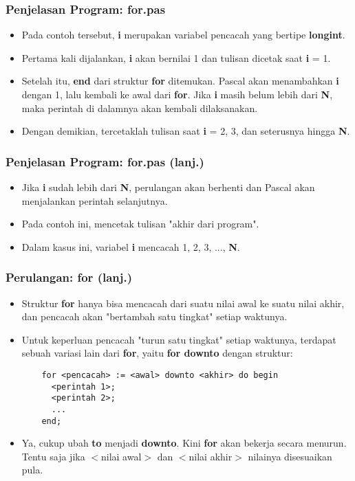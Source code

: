 \begin{frame}
\frametitle{Penjelasan Program: for.pas}
\begin{itemize}
  \item Pada contoh tersebut, \textbf{i} merupakan variabel pencacah yang bertipe \textbf{longint}.
  \item Pertama kali dijalankan, \textbf{i} akan bernilai 1 dan tulisan dicetak saat \textbf{i} = 1.
  \item Setelah itu, \textbf{end} dari struktur \textbf{for} ditemukan. Pascal akan menambahkan \textbf{i} dengan 1, lalu kembali ke awal dari \textbf{for}. Jika \textbf{i} masih belum lebih dari \textbf{N}, maka perintah di dalamnya akan kembali dilaksanakan.
  \item Dengan demikian, tercetaklah tulisan saat \textbf{i} = 2, 3, dan seterusnya hingga \textbf{N}.
\end{itemize}
\end{frame}

\begin{frame}
\frametitle{Penjelasan Program: for.pas (lanj.)}
\begin{itemize}
  \item Jika \textbf{i} sudah lebih dari \textbf{N}, perulangan akan berhenti dan Pascal akan menjalankan perintah selanjutnya.
  \item Pada contoh ini, mencetak tulisan "akhir dari program".
  \item Dalam kasus ini, variabel \textbf{i} mencacah 1, 2, 3, ..., \textbf{N}.
\end{itemize}
\end{frame}

\begin{frame}[fragile]
\frametitle{Perulangan: for (lanj.)}
\begin{itemize}
  \item Struktur \textbf{for} hanya bisa mencacah dari suatu nilai awal ke suatu nilai akhir, dan pencacah akan "bertambah satu tingkat" setiap waktunya.
  \item Untuk keperluan pencacah "turun satu tingkat" setiap waktunya, terdapat sebuah variasi lain dari \textbf{for}, yaitu \textbf{for downto} dengan struktur:
  \begin{lstlisting}
    for <pencacah> := <awal> downto <akhir> do begin
      <perintah 1>;
      <perintah 2>;
      ...
    end;
  \end{lstlisting}
  \item Ya, cukup ubah \alert{\textbf{to}} menjadi \alert{\textbf{downto}}. Kini \textbf{for} akan bekerja secara menurun. Tentu saja jika $<$nilai awal$>$ dan $<$nilai akhir$>$ nilainya disesuaikan pula.
\end{itemize}
\end{frame}

